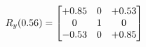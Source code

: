 \documentclass[preview]{standalone}
\begin{document}
\begin{align*}
\special{dvisvgm:raw <g id='unique000'>}R_{y}(0.56) = \begin{bmatrix}+0.85 & 0 & +0.53 \\0 & 1 & 0 \\-0.53 & 0 & +0.85\end{bmatrix}\special{dvisvgm:raw </g>}
\end{align*}
\end{document}
